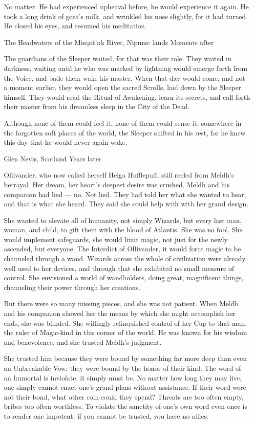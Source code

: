 No matter. He had experienced upheaval before, he would experience it again. He took a long drink of goat’s milk, and wrinkled his nose slightly, for it had turned. He closed his eyes, and resumed his meditation.

The Headwaters of the Misqat’nk River, Nipmuc lands
Moments after

The guardians of the Sleeper waited, for that was their role. They waited in darkness, waiting until he who was marked by lightning would emerge forth from the Voice, and bade them wake his master. When that day would come, and not a moment earlier, they would open the sacred Scrolls, laid down by the Sleeper himself. They would read the Ritual of Awakening, learn its secrets, and call forth their master from his dreamless sleep in the City of the Dead.

Although none of them could feel it, none of them could sense it, somewhere in the forgotten soft places of the world, the Sleeper shifted in his rest, for he knew this day that he would never again wake.

Glen Nevis, Scotland
Years later

Ollivander, who now called herself Helga Hufflepuff, still reeled from Meldh’s betrayal. Her dream, her heart’s deepest desire was crushed. Meldh and his companion had lied — no. Not lied. They had told her what she wanted to hear, and that is what she heard. They said she could help with with her grand design.

She wanted to elevate all of humanity, not simply Wizards, but every last man, woman, and child, to gift them with the blood of Atlantis. She was no fool. She would implement safeguards, she would limit magic, not just for the newly ascended, but everyone. The Interdict of Ollivander, it would force magic to be channeled through a wand. Wizards across the whole of civilization were already well used to her devices, and through that she exhibited no small measure of control. She envisioned a world of wandholders, doing great, magnificent things, channeling their power through her creations.

But there were so many missing pieces, and she was not patient. When Meldh and his companion showed her the means by which she might accomplish her ends, she was blinded. She willingly relinquished control of her Cup to that man, the ruler of Magic-kind in this corner of the world. He was known for his wisdom and benevolence, and she trusted Meldh’s judgment.

She trusted him because they were bound by something far more deep than even an Unbreakable Vow: they were bound by the honor of their kind. The word of an Immortal is inviolate, it simply must be. No matter how long they may live, one simply cannot enact one’s grand plans without assistance. If their word were not their bond, what other coin could they spend? Threats are too often empty, bribes too often worthless. To violate the sanctity of one’s own word even once is to render one impotent: if you cannot be trusted, you have no allies.

